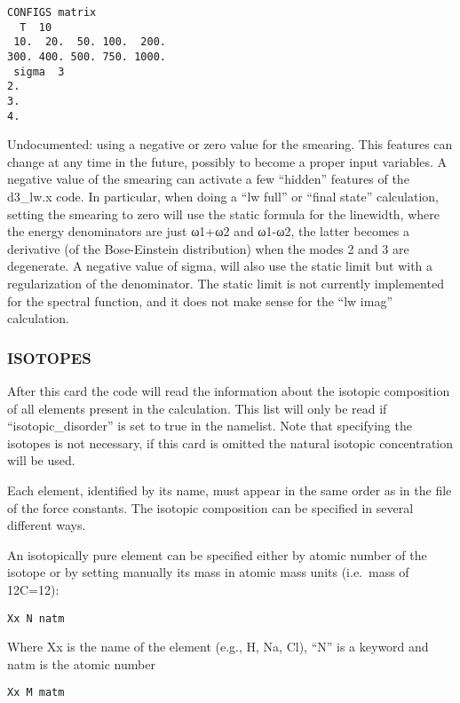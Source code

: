 \documentclass[
]{article}
\begin{document}
\begin{verbatim}
CONFIGS matrix
  T  10
 10.  20.  50. 100.  200.
300. 400. 500. 750. 1000.
 sigma  3
2.
3.
4.
\end{verbatim}

Undocumented: using a negative or zero value for the smearing. This
features can change at any time in the future, possibly to become a
proper input variables. A negative value of the smearing can activate a
few \enquote{hidden} features of the d3\_lw.x code. In particular, when
doing a \enquote{lw full} or \enquote{final state} calculation, setting
the smearing to zero will use the static formula for the linewidth,
where the energy denominators are just ω1+ω2 and ω1-ω2, the latter
becomes a derivative (of the Bose-Einstein distribution) when the modes
2 and 3 are degenerate. A negative value of sigma, will also use the
static limit but with a regularization of the denominator. The static
limit is not currently implemented for the spectral function, and it
does not make sense for the \enquote{lw imag} calculation.

\hypertarget{isotopes}{%
\subsubsection{ISOTOPES}\label{isotopes}}

After this card the code will read the information about the isotopic
composition of all elements present in the calculation. This list will
only be read if \enquote{isotopic\_disorder} is set to true in the
namelist. Note that specifying the isotopes is not necessary, if this
card is omitted the natural isotopic concentration will be used.

Each element, identified by its name, must appear in the same order as
in the file of the force constants. The isotopic composition can be
specified in several different ways.

An isotopically pure element can be specified either by atomic number of
the isotope or by setting manually its mass in atomic mass units
(i.e.~mass of 12C=12):

\begin{verbatim}
Xx N natm
\end{verbatim}

Where Xx is the name of the element (e.g., H, Na, Cl), \enquote{N} is a
keyword and natm is the atomic number

\begin{verbatim}
Xx M matm
\end{verbatim}
\end{document}
